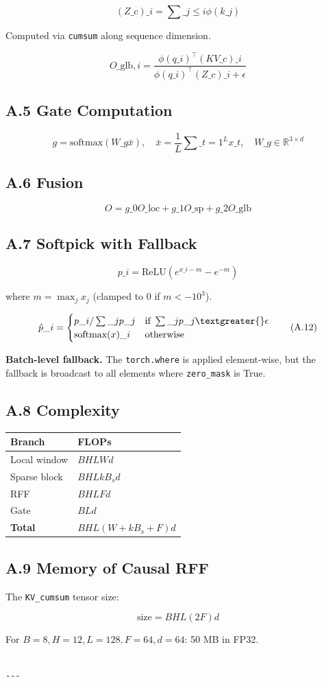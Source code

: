 \[
(Z\_c)\_i = \sum\_{j \leq i} \phi(k\_j)
\tag{A.7}
\]

Computed via \texttt{cumsum} along sequence dimension.

\[
O\_{\text{glb}, i} = \frac{\phi(q\_i)^\top (KV\_c)\_i}{\phi(q\_i)^\top (Z\_c)\_i + \epsilon}
\tag{A.8}
\]

\subsection{A.5 Gate Computation}

\[
g = \text{softmax}(W\_g \bar{x}), \quad
\bar{x} = \frac{1}{L} \sum\_{t=1}^{L} x\_t, \quad
W\_g \in \mathbb{R}^{3 \times d}
\tag{A.9}
\]

\subsection{A.6 Fusion}

\[
O = g\_0 O\_{\text{loc}} + g\_1 O\_{\text{sp}} + g\_2 O\_{\text{glb}}
\tag{A.10}
\]

\subsection{A.7 Softpick with Fallback}

\[
p\_i = \text{ReLU}(e^{x\_i - m} - e^{-m})
\tag{A.11}
\]

where $m = \max_j x_j$ (clamped to $0$ if $m < -10^3$).

\[
\hat{p}\_i = \begin{cases} p\_i / \sum\_j p\_j & \text{if } \sum\_j p\_j \textgreater{} \epsilon \\ \text{softmax}(x)\_i & \text{otherwise} \end{cases}
\tag{A.12}
\]

\textbf{Batch-level fallback.} The \texttt{torch.where} is applied element-wise, but 
the fallback is broadcast to all elements where \texttt{zero\_mask} is True.

\subsection{A.8 Complexity}

\begin{table}[H]
\centering
\small
\begin{tabular}{ll}
\toprule
\textbf{Branch} & \textbf{FLOPs} \\
\midrule
Local window & $B H L W d$ \\
Sparse block & $B H L k B_s d$ \\
RFF & $B H L F d$ \\
Gate & $B L d$ \\
\textbf{Total} & $B H L (W + k B_s + F) d$ \\
\bottomrule
\end{tabular}
\end{table}

\subsection{A.9 Memory of Causal RFF}

The \texttt{KV\_cumsum} tensor size:

\[
\text{size} = B H L (2F) d
\tag{A.13}
\]

For $B=8, H=12, L=128, F=64, d=64$: 50 MB in FP32.
\begin{lstlisting}

---
\end{lstlisting}